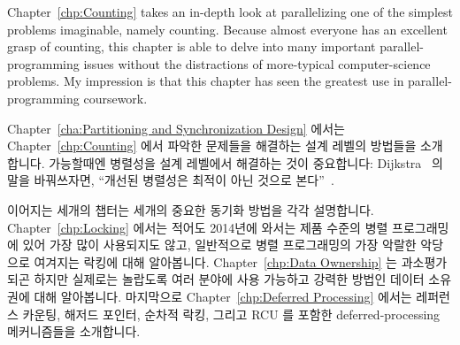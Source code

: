 Chapter~\ref{chp:Counting} takes an in-depth look at parallelizing
one of the simplest problems imaginable, namely counting.
Because almost everyone has an excellent grasp of counting, this chapter
is able to delve into many important parallel-programming issues without
the distractions of more-typical computer-science problems.
My impression is that this chapter has seen the greatest use in
parallel-programming coursework.
\fi

Chapter~\ref{cha:Partitioning and Synchronization Design} 에서는
Chapter~\ref{chp:Counting} 에서 파악한 문제들을 해결하는 설계 레벨의 방법들을
소개합니다.
가능할때엔 병렬성을 설계 레벨에서 해결하는 것이 중요합니다:
Dijkstra~\cite{Dijkstra:1968:LEG:362929.362947} 의 말을 바꿔쓰자면, ``개선된
병렬성은 최적이 아닌 것으로 본다''~\cite{PaulEMcKenney2012HOTPARsuboptimal}.
\iffalse

Chapter~\ref{cha:Partitioning and Synchronization Design}
introduces a number of design-level methods of addressing the issues
identified in Chapter~\ref{chp:Counting}.
It turns out that it is important to address parallelism at
the design level when feasible:
To paraphrase Dijkstra~\cite{Dijkstra:1968:LEG:362929.362947},
``retrofitted parallelism considered grossly
suboptimal''~\cite{PaulEMcKenney2012HOTPARsuboptimal}.
\fi

이어지는 세개의 챕터는 세개의 중요한 동기화 방법을 각각 설명합니다.
Chapter~\ref{chp:Locking} 에서는 적어도 2014년에 와서는 제품 수준의 병렬
프로그래밍에 있어 가장 많이 사용되지도 않고, 일반적으로 병렬 프로그래밍의 가장
악랄한 악당으로 여겨지는 락킹에 대해 알아봅니다.
Chapter~\ref{chp:Data Ownership} 는 과소평가되곤 하지만 실제로는 놀랍도록 여러
분야에 사용 가능하고 강력한 방법인 데이터 소유권에 대해 알아봅니다.
마지막으로 Chapter~\ref{chp:Deferred Processing} 에서는 레퍼런스 카운팅, 해저드
포인터, 순차적 락킹, 그리고 RCU 를 포함한 deferred-processing 메커니즘들을
소개합니다.
\iffalse

The next three chapters examine three important approaches to
synchronization.
Chapter~\ref{chp:Locking} covers locking, which in 2014 is not only the
workhorse of production-quality parallel programming, but is also widely
considered to be parallel programming's worst villain.
Chapter~\ref{chp:Data Ownership} gives a brief overview of data ownership,
an often overlooked but remarkably pervasive and powerful approach.
Finally, Chapter~\ref{chp:Deferred Processing} introduces a number of
deferred-processing mechanisms, including reference counting,
hazard pointers, sequence locking, and RCU.
\fi

